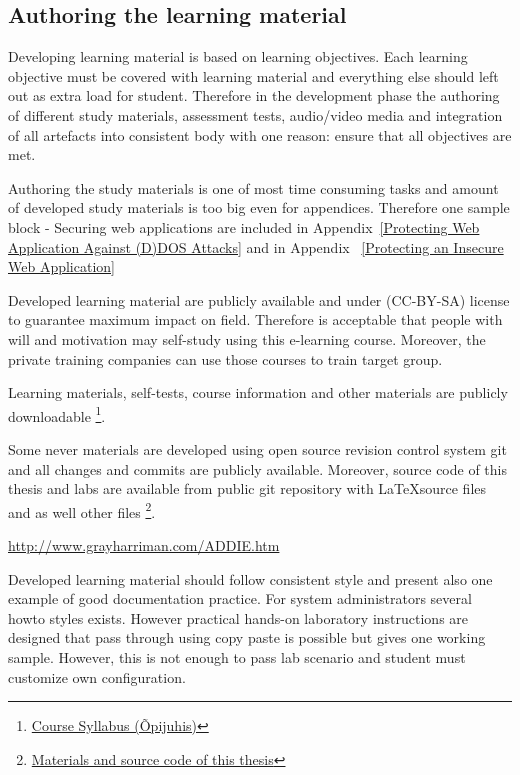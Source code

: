 \subsection{Authoring the learning material}
Developing learning material is based on learning objectives. Each learning objective must be covered with learning material and everything else should left out as extra load for student. Therefore in the development phase the authoring of different study materials, assessment tests, audio/video media and integration of all artefacts into consistent body with one reason: ensure that all objectives are met.

Authoring the study materials is one of most time consuming tasks and amount of developed study materials is too big even for appendices. Therefore one sample block - Securing web applications are included in Appendix~\ref{Protecting Web Application Against (D)DOS Attacks} and in Appendix~ \ref{Protecting an Insecure Web Application} 

Developed learning material are publicly available and under (\gls{CC-BY-SA}) license to guarantee maximum impact on field. Therefore is acceptable that people with will and motivation may self-study using this e-learning course. Moreover, the private training companies can use those courses to train target group.

Learning materials, self-tests, course information and other materials are publicly downloadable \footnote{\href{http://elab.itcollege.ee:8000/cyber-course/}{Course Syllabus (Õpijuhis)}}.


Some never materials are developed using open source revision control system \gls{git} and all changes and commits are publicly available. Moreover, source code of this thesis and labs are available from public \gls{git} repository with \LaTeX  source files and as well other files \footnote{\href{https://github.com/magavdraakon/margus-thesis.git}{Materials and source code of this thesis}}.





\url{http://www.grayharriman.com/ADDIE.htm}

Developed learning material should follow consistent style and present also one example of good documentation practice. For system administrators several howto styles exists. However practical hands-on laboratory instructions are designed that pass through using copy paste is possible but gives one working sample. However, this is not enough to pass lab scenario and student must customize own configuration.

